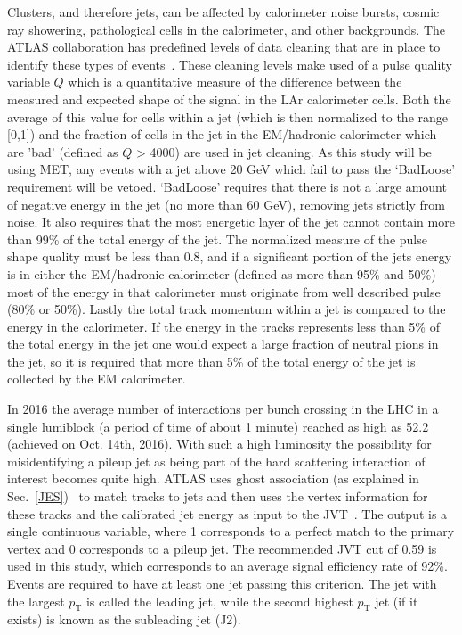 Clusters, and therefore jets, can be affected by calorimeter noise bursts, cosmic ray showering, pathological cells in the calorimeter, and other backgrounds.  
The ATLAS collaboration has predefined levels of data cleaning that are in place to identify these types of events~\cite{ATLAS-CONF-2015-029}.  
These cleaning levels make used of a pulse quality variable $Q$ which is a quantitative measure of the difference between the measured and expected shape of the signal in the LAr calorimeter cells.  
Both the average of this value for cells within a jet (which is then normalized to the range [0,1]) and the fraction of cells in the jet in the EM/hadronic calorimeter which are 'bad' (defined as $Q$ > 4000) are used in jet cleaning.  
As this study will be using MET, any events with a jet above 20 GeV which fail to pass the `BadLoose' requirement will be vetoed.  
`BadLoose' requires that there is not a large amount of negative energy in the jet (no more than 60 GeV), removing jets strictly from noise.   
It also requires that the most energetic layer of the jet cannot contain more than 99\% of the total energy of the jet.   
The normalized measure of the pulse shape quality must be less than 0.8, and if a significant portion of the jets energy is in either the EM/hadronic calorimeter (defined as more than 95\% and 50\%) most of the energy in that calorimeter must originate from well described pulse (80\% or 50\%).  
Lastly the total track momentum within a jet is compared to the energy in the calorimeter.  
If the energy in the tracks represents less than 5\% of the total energy in the jet one would expect a large fraction of neutral pions in the jet, so it is required that more than 5\% of the total energy of the jet is collected by the EM calorimeter.  

In 2016 the average number of interactions per bunch crossing in the LHC in a single lumiblock (a period of time of about 1 minute) reached as high as 52.2 (achieved on Oct. 14th, 2016).  
With such a high luminosity the possibility for misidentifying a pileup jet as being part of the hard scattering interaction of interest becomes quite high.  
ATLAS uses ghost association (as explained in Sec.~\ref{JES})~\cite{ATLAS-CONF-2013-083} to match tracks to jets and then uses the vertex information for these tracks and the calibrated jet energy as input to the \gls{JVT}~\cite{ATLAS-CONF-2014-018}.  
The output is a single continuous variable, where 1 corresponds to a perfect match to the primary vertex and 0 corresponds to a pileup jet.  
The recommended JVT cut of 0.59 is used in this study, which corresponds to an average signal efficiency rate of 92\%.  
Events are required to have at least one jet passing this criterion.  
The jet with the largest $p_{\mathrm T}$ is called the leading jet, while the second highest $p_{\mathrm T}$ jet (if it exists) is known as the subleading jet (J2).  

